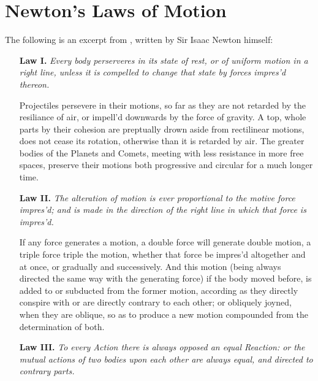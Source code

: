 \chapter{Newton's Laws of Motion}

The following is an excerpt from \cite[p.~20]{newton}, written by Sir Isaac Newton himself:

\begin{itemize}
  \item[\textbf{Law I.} ]
      \emph{
        Every body perserveres in its state of rest, or of uniform motion in a right
        line, unless it is compelled to change that state by forces impres'd thereon.
      }

      Projectiles persevere in their motions, so far as they are not retarded by
      the resiliance of air, or impell'd downwards by the force of gravity. A
      top, whole parts by their cohesion are preptually drown aside from
      rectilinear motions, does not cease its rotation, otherwise than it is
      retarded by air. The greater bodies of the Planets and Comets, meeting
      with less resistance in more free spaces, preserve their motions both
      progressive and circular for a much longer time.
  \item[\textbf{Law II.} ]
      \emph{
        The alteration of motion is ever proportional to the motive force
        impres'd; and is made in the direction of the right line in which that
        force is impres'd.
      }

      If any force generates a motion, a double force will generate double
      motion, a triple force triple the motion, whether that force be impres'd
      altogether and at once, or gradually and successively. And this motion
      (being always directed the same way with the generating force) if the body
      moved before, is added to or subducted from the former motion, according
      as they directly conspire with or are directly contrary to each other; or
      obliquely joyned, when they are oblique, so as to produce a new motion
      compounded from the determination of both.
  \item[\textbf{Law III.} ]
      \emph{
        To every Action there is always opposed an equal Reaction: or the mutual
        actions of two bodies upon each other are always equal, and directed to
        contrary parts.
      }


\end{itemize}
